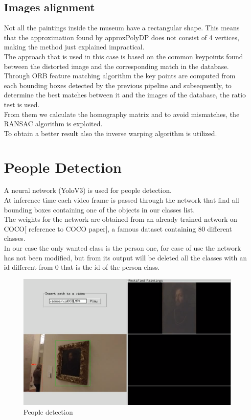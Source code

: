 \documentclass[conference]{IEEEtran}
\begin{document}
\subsection{Images alignment}
Not all the paintings inside the museum have a rectangular shape. This means that the approximation found by approxPolyDP does not consist of 4 vertices, making the method just explained impractical.\\
The approach that is used in this case is based on the common keypoints found between the distorted image and the corresponding match in the database.\\
Through ORB feature matching algorithm the key points are computed from each bounding boxes detected by the previous pipeline and subsequently, to determine the best matches between it and the images of the database, the ratio test is used.\\
From them we calculate the homography matrix and
to avoid mismatches, the RANSAC algorithm is exploited.\\
To obtain a better result also the inverse warping algorithm is utilized.\\

\section{People Detection}
A neural network (YoloV3) is used for people detection.\\
At inference time each video frame is passed through the network that find all bounding boxes containing one of the objects in our classes list.\\
The weights for the network are obtained from an already trained network on COCO[ reference to COCO paper], a famous dataset containing 80 different classes.\\
In our case the only wanted class is the person one, for ease of use the network has not been modified, but from its output will be deleted all the classes with an id different from 0 that is the id of the person class.\\

\begin{figure}[htbp]
\centerline{\includegraphics[width=0.8\columnwidth]{../people_detection/paint_and_person.png}}
\caption{People detection}
\label{fig_People_detection}
\end{figure}
\end{document}
